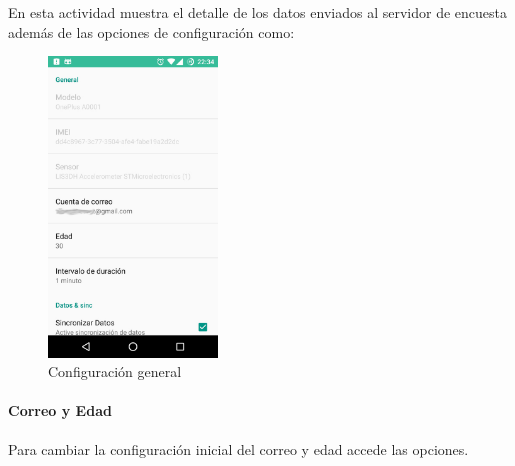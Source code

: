 {En esta actividad muestra el detalle de los datos enviados al servidor de encuesta además de las opciones
de configuración como:
\begin{figure}[!htbp]
    \centering
    \includegraphics[width=0.4\textwidth]{anexos/graphics/conf_gral.jpg}
\caption{Configuración general}\label{config_adic:id2}\end{figure}


\paragraph{Correo y Edad}
\label{config_adic:correo-y-edad}
Para cambiar la configuración inicial del correo y edad accede las opciones.

}
